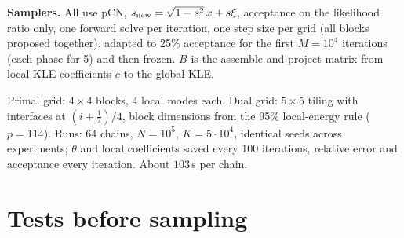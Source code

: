 \documentclass[11pt]{article}
\begin{document}
\textbf{Samplers.} All use pCN, $s_{\rm new}=\sqrt{1-s^2}\,x+s\xi$, acceptance on the likelihood ratio only, one forward solve per iteration, one step size per grid (all blocks proposed together), adapted to 25\% acceptance for the first $M=10^4$ iterations (each phase for 5) and then frozen. $B$ is the assemble-and-project matrix from local KLE coefficients $c$ to the global KLE.
\begin{center}\small
{}\end{center}
Primal grid: $4\times4$ blocks, 4 local modes each. Dual grid: $5\times5$ tiling with interfaces at $(i+\tfrac12)/4$, block dimensions from the 95\% local-energy rule ($p=114$). Runs: 64 chains, $N=10^5$, $K=5\cdot10^4$, identical seeds across experiments; $\theta$ and local coefficients saved every 100 iterations, relative error and acceptance every iteration. About $103$\,s per chain.

\section{Tests before sampling}
\end{document}
